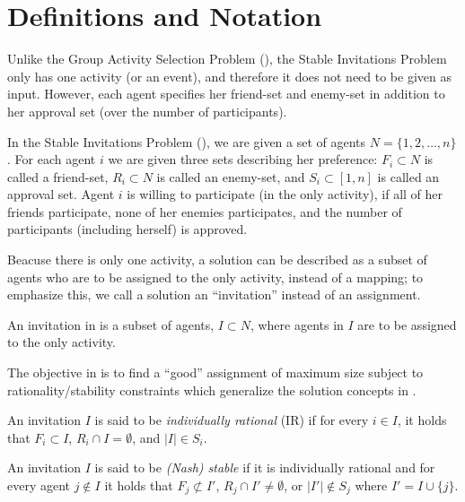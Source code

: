 \section{Definitions and Notation} \label{sec:SIP:prelim}

Unlike the Group Activity Selection Problem (\GASP), the Stable Invitations Problem only has one activity (or an event), and therefore it does not need to be given as input.
However, each agent specifies her friend-set and enemy-set in addition to her approval set (over the number of participants). 

\begin{definition}
	In the Stable Invitations Problem (\SIP), we are given a set of agents $N = \{1, 2, \dots, n\}$.
	For each agent $i$ we are given three sets describing her preference: $F_i \subset N$ is called a friend-set, $R_i \subset N$ is called an enemy-set, and $S_i \subset [1,n]$ is called an approval set.
	Agent $i$ is willing to participate (in the only activity), if all of her friends participate, none of her enemies participates, and the number of participants (including herself) is approved.
\end{definition}

Beacuse there is only one activity, a solution can be described as a subset of agents who are to be assigned to the only activity, instead of a mapping; to emphasize this, we call a solution an ``invitation'' instead of an assignment. 

\begin{definition}
	An invitation in \SIPs is a subset of agents, $I \subset N$, where agents in $I$ are to be assigned to the only activity. 
\end{definition}

The objective in \SIPs is to find a ``good'' assignment of maximum size subject to rationality/stability constraints which generalize the solution concepts in \GASP.

\begin{definition}
	An invitation $I$ is said to be {\em individually rational} (IR) if for every $i\in I$, 
	it holds that $F_i \subset I$, $R_i \cap I = \emptyset$, and $|I| \in S_i$.

	An invitation $I$ is said to be {\em (Nash) stable} if it is individually rational and for every agent $j \not\in I$ it holds that $F_j \not\subset I'$, $R_j \cap I' \neq \emptyset$, or $|I'| \not\in S_j$ where $I' = I \cup \{j\}$. 

\end{definition}

